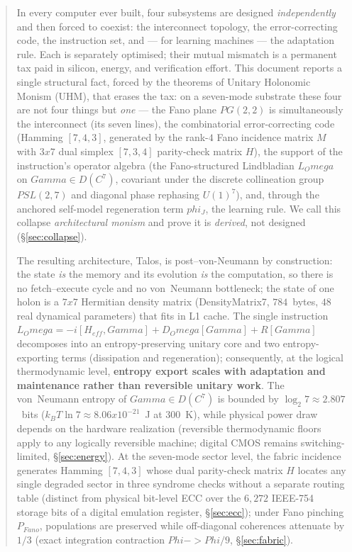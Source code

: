 \documentclass[10pt,letterpaper]{article}
\theoremstyle{talos}
\newcommand{\Gam}{\ensuremath{\Gamma}}
\newcommand{\Dens}{\ensuremath{\mathcal{D}}}
\newcommand{\Lind}{\ensuremath{\mathcal{L}}}
\newcommand{\LindOmega}{\ensuremath{\Lind_\Omega}}
\newcommand{\Regen}{\ensuremath{\mathcal{R}}}
\newcommand{\Diss}{\ensuremath{\mathcal{D}_\Omega}}
\newcommand{\Fano}{\ensuremath{\mathrm{PG}(2,2)}}
\newcommand{\DM}{\textsc{DensityMatrix7}\xspace}
\newcommand{\TALOS}{\textsc{Talos}\xspace}
\def\Gam{Gamma}\def\Dens{D}\def\Lind{L}\def\LindOmega{L_Omega}\def\Regen{R}\def\Diss{D_Omega}%
\def\mathrm#1{#1}\def\mathbb#1{#1}\def\mathcal#1{#1}\def\mathbf#1{#1}\def\mathfrak#1{#1}\def\textsc#1{#1}%
\def\to{->}\def\Rightarrow{=>}\def\times{x}\def\otimes{(x)}\def\oplus{(+)}\def\cdot{.}%
\def\Omega{Omega}\def\Phi{Phi}\def\Gamma{Gamma}\def\rho{rho}\def\kappa{kappa}\def\varphi{phi}%
\begin{document}
\begin{abstract}
\noindent
In every computer ever built, four subsystems are designed
\emph{independently} and then forced to coexist: the interconnect topology,
the error-correcting code, the instruction set, and --- for learning
machines --- the adaptation rule. Each is separately optimised; their
mutual mismatch is a permanent tax paid in silicon, energy, and
verification effort. This document reports a single structural fact,
forced by the theorems of Unitary Holonomic Monism (UHM), that erases the
tax: on a seven-mode substrate these four are not four things but
\emph{one} --- the Fano plane $\Fano$ is simultaneously the interconnect
(its seven lines), the combinatorial error-correcting code (Hamming $[7,4,3]$,
generated by the rank-$4$ Fano incidence matrix $M$ with $3\times 7$ dual
simplex $[7,3,4]$ parity-check matrix $H$), the support of the instruction's
operator algebra (the Fano-structured Lindbladian $\LindOmega$ on
$\Gam\in\Dens(\mathbb{C}^7)$, covariant under the discrete collineation group
$\mathrm{PSL}(2,7)$ and diagonal phase rephasing $U(1)^7$),
and, through the anchored self-model regeneration term $\varphi_J$, the learning rule.
We call this collapse \emph{architectural monism} and prove it is
\emph{derived}, not designed (\S\ref{sec:collapse}).

The resulting architecture, \TALOS{}, is post--von-Neumann by construction:
the state \emph{is} the memory and its evolution \emph{is} the computation,
so there is no fetch--execute cycle and no von~Neumann bottleneck; the
state of one holon is a $7\times7$ Hermitian density matrix
(\DM{}, $784$~bytes, $48$ real dynamical parameters) that fits in L1 cache. The
single instruction $\LindOmega = -i[H_{\mathrm{eff}},\Gam] + \Diss[\Gam] +
\Regen[\Gam]$ decomposes into an entropy-preserving unitary core and two
entropy-exporting terms (dissipation and regeneration); consequently, at the
logical thermodynamic level, \textbf{entropy export scales with adaptation and
maintenance rather than reversible unitary work}. The von~Neumann entropy of
$\Gam\in\Dens(\mathbb{C}^7)$ is bounded by $\log_2 7\approx 2.807$~bits
($k_BT\ln 7\approx 8.06\times10^{-21}$~J at $300$~K), while physical power draw
depends on the hardware realization (reversible thermodynamic floors apply to
any logically reversible machine; digital CMOS remains switching-limited,
\S\ref{sec:energy}). At the seven-mode sector level, the fabric incidence
generates Hamming $[7,4,3]$ whose dual parity-check matrix $H$ locates any
single degraded sector in three syndrome checks without a separate routing table
(distinct from physical bit-level ECC over the $6{,}272$ IEEE-754 storage bits
of a digital emulation register, \S\ref{sec:ecc}); under Fano pinching
$\mathcal{P}_{\mathrm{Fano}}$, populations are preserved while off-diagonal
coherences attenuate by $1/3$ (exact integration contraction $\Phi\to\Phi/9$,
\S\ref{sec:fabric}).


\end{abstract}
\end{document}

